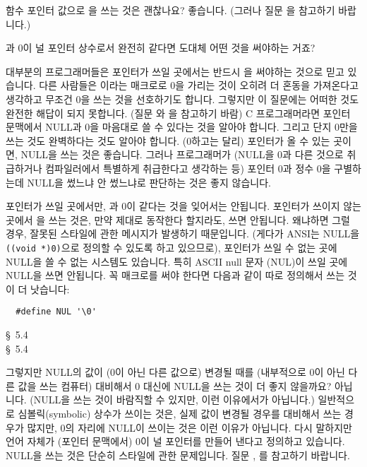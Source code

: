 \begin{faq}
	함수 포인터 값으로 을 쓰는 것은 괜찮나요?
\A
	좋습니다. (그러나 질문 을 참고하기 바랍니다.)
\end{faq}

\begin{faq}
	과 0이 널 포인터 상수로서 완전히 같다면 도대체 어떤 것을
	써야하는 거죠?

\A
	대부분의 프로그래머들은 포인터가 쓰일 곳에서는 반드시 을
	써야하는
	것으로 믿고 있습니다.  다른 사람들은 이라는 매크로로 0을
	가리는 것이 오히려 더 혼동을 가져온다고 생각하고 무조건 0을
	쓰는 것을 선호하기도 합니다.  그렇지만 이 질문에는 어떠한 것도
	완전한 해답이 되지 못합니다.  (질문 와 을 참고하기 바람)
	C 프로그래머라면 포인터 문맥에서 NULL과 0을 마음대로 쓸 수 있다는
	것을 알아야 합니다.  그리고 단지 0만을 쓰는 것도 완벽하다는 것도
	알아야 합니다.  (0하고는 달리) 포인터가 올 수 있는 곳이면, NULL을
	쓰는 것은 좋습니다.  그러나 프로그래머가 
	(NULL을 0과 다른 것으로 취급하거나 컴파일러에서
	특별하게 취급한다고 생각하는 등) 포인터 0과 정수 0을 구별하는데
	NULL을 썼느냐 안 썼느냐로 판단하는 것은 좋지 않습니다.

	포인터가 쓰일 곳에서만, 과 0이 같다는 것을 잊어서는 안됩니다.
	포인터가 쓰이지 않는 곳에서 을 쓰는 것은, 만약 제대로
	동작한다 할지라도, 쓰면 안됩니다. 
	왜냐하면 그럴 경우, 잘못된 스타일에 관한
	메시지가 발생하기 때문입니다.  (게다가 ANSI는 NULL을
	 \verb+((void *)0)+으로 정의할 수 있도록 하고 있으므로), 포인터가
	쓰일 수 없는 곳에 NULL을 쓸 수 없는 시스템도 있습니다.
	특히 ASCII null 문자 (NUL)이 쓰일 곳에 NULL을 쓰면 안됩니다.
	꼭 매크로를 써야 한다면 다음과 같이 따로 정의해서 쓰는 것이
	더 낫습니다:

\begin{verbatim}
  #define NUL '\0'
\end{verbatim}

\R	\cite{kr1} \S\ 5.4  \\
	\cite{kr2} \S\ 5.4 
\end{faq}

\begin{faq}
	그렇지만 NULL의 값이 (0이 아닌 다른 값으로) 변경될 때를
	(내부적으로 0이 아닌 다른 값을 쓰는 컴퓨터) 대비해서 0 대신에
	NULL을 쓰는 것이 더 좋지 않을까요?
\A
	아닙니다.  (NULL을 쓰는 것이 바람직할 수 있지만, 이런 이유에서가
	아닙니다.) 일반적으로 심볼릭(symbolic) 상수가 쓰이는 것은, 실제
	값이 변경될 경우를 대비해서 쓰는 경우가 많지만, 0의 자리에
	NULL이 쓰이는 것은 이런 이유가 아닙니다.  다시 말하지만
	언어 자체가 (포인터 문맥에서) 0이 널 포인터를 만들어 낸다고
	정의하고 있습니다.  NULL을 쓰는 것은 단순히 스타일에 관한 문제입니다.
	질문 , 를 참고하기 바랍니다.
\end{faq}

